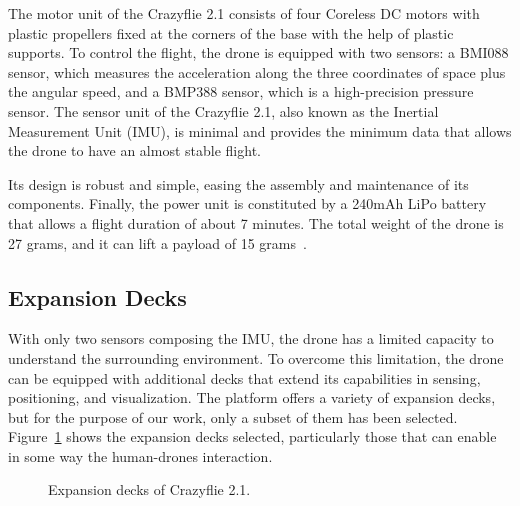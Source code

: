 The motor unit of the Crazyflie 2.1 consists of four Coreless DC motors with plastic propellers fixed at the corners of the base with the help of plastic supports.
To control the flight, the drone is equipped with two sensors: a BMI088 sensor, which measures the acceleration along the three coordinates of space plus the angular speed, 
and a BMP388 sensor, which is a high-precision pressure sensor.
The sensor unit of the Crazyflie 2.1, also known as the Inertial Measurement Unit (IMU), is minimal and provides the minimum data that allows the drone to have an almost stable flight.

Its design is robust and simple, easing the assembly and maintenance of its components.
Finally, the power unit is constituted by a 240mAh LiPo battery that allows a flight duration of about 7 minutes. 
The total weight of the drone is 27 grams, and it can lift a payload of 15 grams~\cite{crazyflie}. 


\subsection{Expansion Decks}\label{subsec:expansion_decks}
With only two sensors composing the IMU, the drone has a limited capacity to understand the surrounding environment. 
To overcome this limitation, the drone can be equipped with additional decks that extend its capabilities in sensing, positioning, and visualization.
The platform offers a variety of expansion decks, but for the purpose of our work, only a subset of them has been selected.
Figure~\ref{fig:decks} shows the expansion decks selected, particularly those that can enable in some way the human-drones interaction.

\begin{figure}[h]
    \centering
    \quad
    \quad
    \quad
    \quad
    \caption{Expansion decks of Crazyflie 2.1.}\label{fig:decks}
\end{figure}


